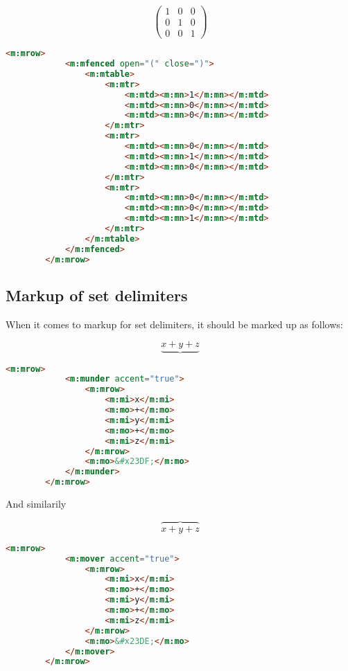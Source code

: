 \documentclass[english,a4paper,11pt]{article}
\begin{document}
\begin{eksempler}
	\begin{equation}
	\begin{pmatrix}
		1 & 0 & 0\\
		0 & 1 & 0\\
		0 & 0 & 1
	\end{pmatrix}
	\end{equation}

	\begin{lstlisting}[language=HTML]
		<m:mrow>
			<m:mfenced open="(" close=")">
				<m:mtable>
					<m:mtr>
						<m:mtd><m:mn>1</m:mn></m:mtd>
						<m:mtd><m:mn>0</m:mn></m:mtd>
						<m:mtd><m:mn>0</m:mn></m:mtd>
					</m:mtr>
					<m:mtr>
						<m:mtd><m:mn>0</m:mn></m:mtd>
						<m:mtd><m:mn>1</m:mn></m:mtd>
						<m:mtd><m:mn>0</m:mn></m:mtd>
					</m:mtr>
					<m:mtr>
						<m:mtd><m:mn>0</m:mn></m:mtd>
						<m:mtd><m:mn>0</m:mn></m:mtd>
						<m:mtd><m:mn>1</m:mn></m:mtd>
					</m:mtr>
				</m:mtable>
			</m:mfenced>
	  	</m:mrow>
	\end{lstlisting}
\end{eksempler}

\subsection{Markup of set delimiters}

When it comes to markup for set delimiters, it should be marked up as follows:

\begin{eksempler}
	\begin{equation}
		\underbrace{x+y+z}
	\end{equation}

	\begin{lstlisting}[language=HTML]
		<m:mrow>
			<m:munder accent="true">
				<m:mrow>
					<m:mi>x</m:mi>
					<m:mo>+</m:mo>
					<m:mi>y</m:mi>
					<m:mo>+</m:mo>
					<m:mi>z</m:mi>
				</m:mrow>
				<m:mo>&#x23DF;</m:mo>
			</m:munder>
	  	</m:mrow>
	\end{lstlisting}


And similarily

	\begin{equation}
		\overbrace{x+y+z}
	\end{equation}

	\begin{lstlisting}[language=HTML]
		<m:mrow>
			<m:mover accent="true">
				<m:mrow>
					<m:mi>x</m:mi>
					<m:mo>+</m:mo>
					<m:mi>y</m:mi>
					<m:mo>+</m:mo>
					<m:mi>z</m:mi>
				</m:mrow>
				<m:mo>&#x23DE;</m:mo>
			</m:mover>
	  	</m:mrow>
	\end{lstlisting}
\end{eksempler}
\end{document}
